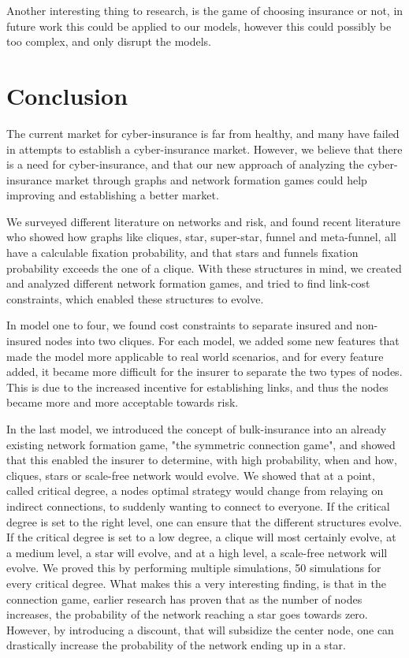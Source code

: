 Another interesting thing to research, is the game of choosing insurance or not, in future work this could be applied to our models, however this could possibly be too complex, and only disrupt the models.

\section{Conclusion}

The current market for cyber-insurance is far from healthy, and many have failed in attempts to establish a cyber-insurance market. However, we believe that there is a need for cyber-insurance, and that our new approach of analyzing the cyber-insurance market through graphs and network formation games could help improving and establishing a better market.  

We surveyed different literature on networks and risk, and found recent literature who showed how graphs like cliques, star, super-star, funnel and meta-funnel, all have a calculable fixation probability, and that stars and funnels fixation probability exceeds the one of a clique. 
With these structures in mind, we created and analyzed different network formation games, and tried to find link-cost constraints, which enabled these structures to evolve.

In model one to four, we found cost constraints to separate insured and non-insured nodes into two cliques. 
For each model, we added some new features that made the model more applicable to real world scenarios, and for every feature added, it became more difficult for the insurer to separate the two types of nodes. This is due to the increased incentive for establishing links, and thus the nodes became more and more acceptable towards risk. 


In the last model, we introduced the concept of bulk-insurance into an already existing network formation game, "the symmetric connection game", and showed that this enabled the insurer to determine, with high probability, when and how, cliques, stars or scale-free network would evolve. We showed that at a point, called critical degree, a nodes optimal strategy would change from relaying on indirect connections, to suddenly wanting to connect to everyone. If the critical degree is set to the right level, one can ensure that the different structures evolve. If the critical degree is set to a low degree, a clique will most certainly evolve, at a medium level, a star will evolve, and at a high level, a scale-free network will evolve. We proved this by performing multiple simulations, 50 simulations for every critical degree.  
What makes this a very interesting finding, is that in the connection game, earlier research has proven that as the number of nodes increases, the probability of the network reaching a star goes towards zero. However, by introducing a discount, that will subsidize the center node, one can drastically increase the probability of the network ending up in a star.

